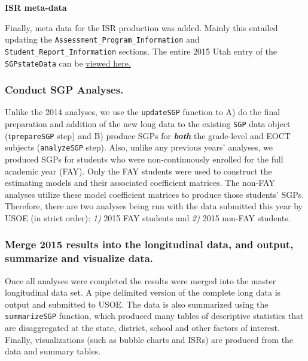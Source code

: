 \documentclass[12pt]{article}
\begin{document}
\textbf{ISR meta-data}

Finally, meta data for the ISR production was added. Mainly this
entailed updating the \texttt{Assessment\_Program\_Information} and
\texttt{Student\_Report\_Information} sections. The entire 2015 Utah
entry of the \texttt{SGPstateData} can be
\href{https://github.com/CenterForAssessment/SGPstateData/blob/2f1362d2411a94f7e244127cdb332683a3c2ba05/SGPstateData.R\#L4702}{viewed
here.}

\subsubsection{Conduct SGP Analyses.}\label{conduct-sgp-analyses.}

Unlike the 2014 analyses, we use the \texttt{updateSGP} function to A)
do the final preparation and addition of the new long data to the
existing \texttt{SGP} data object (t\texttt{prepareSGP} step) and B)
produce SGPs for \textbf{\emph{both}} the grade-level and EOCT subjects
(\texttt{analyzeSGP} step). Also, unlike any previous years' analyses,
we produced SGPs for students who were non-continuously enrolled for the
full academic year (FAY). Only the FAY students were used to construct
the estimating models and their associated coefficient matrices. The
non-FAY analyses utilize these model coefficient matrices to produce
those students' SGPs. Therefore, there are two analyses being run with
the data submitted this year by USOE (in strict order): \emph{1)} 2015
FAY students and \emph{2)} 2015 non-FAY students.

\subsubsection{Merge 2015 results into the longitudinal data, and
output, summarize and visualize
data.}\label{merge-2015-results-into-the-longitudinal-data-and-output-summarize-and-visualize-data.}

Once all analyses were completed the results were merged into the master
longitudinal data set. A pipe delimited version of the complete long
data is output and submitted to USOE. The data is also summarized using
the \texttt{summarizeSGP} function, which produced many tables of
descriptive statistics that are disaggregated at the state, district,
school and other factors of interest. Finally, visualizations (such as
bubble charts and ISRs) are produced from the data and summary tables.

\pagebreak
\end{document}
